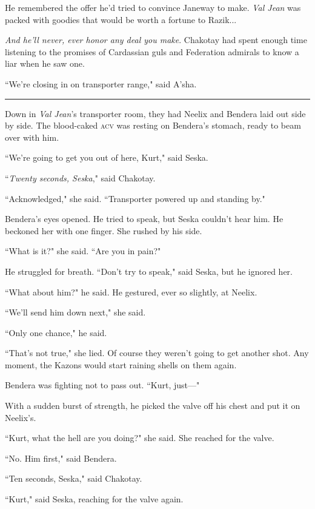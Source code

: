 \documentclass[twoside,letterpaper,12pt]{memoir}
\begin{document}
He remembered the offer he'd tried to convince Janeway to make. \textit{Val Jean} was packed with goodies that would be worth a fortune to Razik...

\textit{And he'll never, ever honor any deal you make}. Chakotay had spent enough time listening to the promises of Cardassian guls and Federation admirals to know a liar when he saw one.

``We're closing in on transporter range," said A'sha.

\begin{center}\rule{3cm}{0.4 pt}\end{center}

Down in \textit{Val Jean}'s transporter room, they had Neelix and Bendera laid out side by side. The blood-caked \textsc{acv} was resting on Bendera's stomach, ready to beam over with him.

``We're going to get you out of here, Kurt," said Seska.

``\textit{Twenty seconds, Seska}," said Chakotay.

``Acknowledged," she said. ``Transporter powered up and standing by."

Bendera's eyes opened. He tried to speak, but Seska couldn't hear him. He beckoned her with one finger. She rushed by his side.

``What is it?" she said. ``Are you in pain?"

He struggled for breath. ``Don't try to speak," said Seska, but he ignored her.

``What about him?" he said. He gestured, ever so slightly, at Neelix.

``We'll send him down next," she said.

``Only one chance," he said.

``That's not true," she lied. Of course they weren't going to get another shot. Any moment, the Kazons would start raining shells on them again.

Bendera was fighting not to pass out. ``Kurt, just---"

With a sudden burst of strength, he picked the valve off his chest and put it on Neelix's.

``Kurt, what the hell are you doing?" she said. She reached for the valve.

``No. Him first," said Bendera.

``Ten seconds, Seska," said Chakotay.

``Kurt," said Seska, reaching for the valve again.
\end{document}
